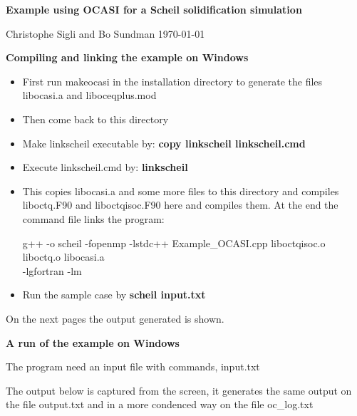 \documentclass[12pt]{article}
\begin{document}
\begin{center}
{\large \bf Example using OCASI for a Scheil solidification simulation}

\bigskip

Christophe Sigli and Bo Sundman \today

\end{center}

\bigskip

{\Large \bf Compiling and linking the example on Windows}

\bigskip

\begin{itemize}
\item First run makeocasi in the installation directory to generate the
  files libocasi.a and liboceqplus.mod

\item Then come back to this directory

\item Make linkscheil executable by: {\bf copy linkscheil linkscheil.cmd}

\item Execute linkscheil.cmd by: {\bf linkscheil}

\item This copies libocasi.a and some more files to this directory and
  compiles liboctq.F90 and liboctqisoc.F90 here and compiles them.
  At the end the command file links the program:

  g++ -o scheil -fopenmp -lstdc++ Example\_OCASI.cpp liboctqisoc.o
  liboctq.o libocasi.a\\ -lgfortran -lm

\item Run the sample case by {\bf scheil input.txt}
\end{itemize}

On the next pages the output generated is shown.

\newpage

{\large \bf A run of the example on Windows}

\bigskip

The program need an input file with commands, input.txt

The output below is captured from the screen, it generates the same
output on the file output.txt and in a more condenced way on the file
oc\_log.txt
\end{document}
